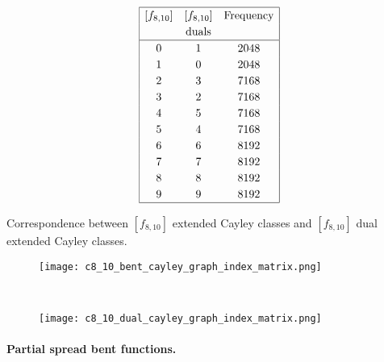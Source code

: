 \documentclass[12pt,a4paper]{article}
\begin{document}
\begin{table}
\small{}
\begin{align*}
\def\arraystretch{1.2}
\begin{array}{|ccc|}
\hline
[f_{8,10}] &
[f_{8,10}] &
\text{Frequency}
\\
&
\text{duals} &
\\
\hline
  0 &    1 & 2048
\\
  1 &    0 & 2048
\\
  2 &    3 & 7168
\\
  3 &    2 & 7168
\\
  4 &    5 & 7168
\\
  5 &    4 & 7168
\\
  6 &    6 & 8192
\\
  7 &    7 & 8192
\\
  8 &    8 & 8192
\\
  9 &    9 & 8192
\\
\hline
\end{array}
\end{align*}
\caption{Correspondence between $[f_{8,10}]$ extended Cayley classes and $[f_{8,10}]$ dual extended Cayley classes.}
\label{tab-c8_10-dual-EC_classes}
\end{table}

\begin{figure}[!bhpt] %
\centering
\begin{minipage}{.48\textwidth}
  \centering
  \texttt{[image: c8\_10\_bent\_cayley\_graph\_index\_matrix.png]}
  \label{fig:c8_10_bent_cayley_graph_index_matrix}
\end{minipage}
~~
\begin{minipage}{.48\textwidth}
  \centering
  \texttt{[image: c8\_10\_dual\_cayley\_graph\_index\_matrix.png]}
  \label{fig:c8_10_dual_cayley_graph_index_matrix}
\end{minipage}%
\end{figure}
\newpage
\paragraph*{Partial spread bent functions.}
\end{document}

